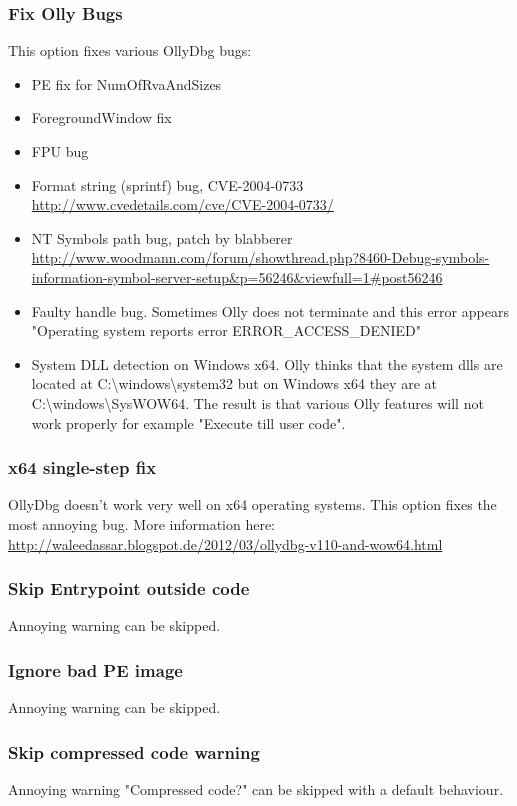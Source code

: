 \documentclass[10pt,a4paper]{article}
\begin{document}
\subsubsection{Fix Olly Bugs}
This option fixes various OllyDbg bugs: 
\begin{itemize}
\item PE fix for NumOfRvaAndSizes
\item ForegroundWindow fix
\item FPU bug
\item Format string (sprintf) bug, CVE-2004-0733 \url{http://www.cvedetails.com/cve/CVE-2004-0733/}
\item NT Symbols path bug, patch by blabberer \url{http://www.woodmann.com/forum/showthread.php?8460-Debug-symbols-information-symbol-server-setup&p=56246&viewfull=1#post56246}
\item Faulty handle bug. Sometimes Olly does not terminate and this error appears "Operating system reports error ERROR\_ACCESS\_DENIED"
\item System DLL detection on Windows x64. Olly thinks that the system dlls are located at C:\textbackslash{}windows\textbackslash{}system32 but on Windows x64 they are at C:\textbackslash{}windows\textbackslash{}SysWOW64. The result is that various Olly features will not work properly for example "Execute till user code".
\end{itemize}

\subsubsection{x64 single-step fix}
OllyDbg doesn't work very well on x64 operating systems. This option fixes the most annoying bug. More information here: \url{http://waleedassar.blogspot.de/2012/03/ollydbg-v110-and-wow64.html}
\subsubsection{Skip Entrypoint outside code}
Annoying warning can be skipped.
\subsubsection{Ignore bad PE image}
Annoying warning can be skipped.
\subsubsection{Skip compressed code warning}
Annoying warning "Compressed code?" can be skipped with a default behaviour.
\end{document}
